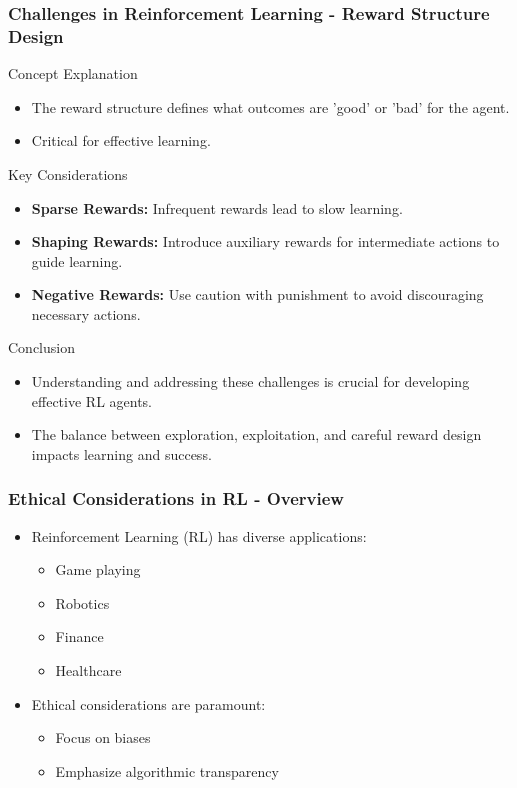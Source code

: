 \documentclass[aspectratio=169]{beamer}
\begin{document}
\begin{frame}[fragile]
    \frametitle{Challenges in Reinforcement Learning - Reward Structure Design}
    \begin{block}{Concept Explanation}
        \begin{itemize}
            \item The reward structure defines what outcomes are 'good' or 'bad' for the agent.
            \item Critical for effective learning.
        \end{itemize}
    \end{block}
    
    \begin{block}{Key Considerations}
        \begin{itemize}
            \item \textbf{Sparse Rewards:} Infrequent rewards lead to slow learning.
            \item \textbf{Shaping Rewards:} Introduce auxiliary rewards for intermediate actions to guide learning.
            \item \textbf{Negative Rewards:} Use caution with punishment to avoid discouraging necessary actions.
        \end{itemize}
    \end{block}

    \begin{block}{Conclusion}
        \begin{itemize}
            \item Understanding and addressing these challenges is crucial for developing effective RL agents.
            \item The balance between exploration, exploitation, and careful reward design impacts learning and success.
        \end{itemize}
    \end{block}
\end{frame}

\begin{frame}[fragile]
    \frametitle{Ethical Considerations in RL - Overview}
    \begin{itemize}
        \item Reinforcement Learning (RL) has diverse applications:
        \begin{itemize}
            \item Game playing
            \item Robotics
            \item Finance
            \item Healthcare
        \end{itemize}
        \item Ethical considerations are paramount:
        \begin{itemize}
            \item Focus on biases
            \item Emphasize algorithmic transparency
        \end{itemize}
    \end{itemize}
\end{frame}
\end{document}
